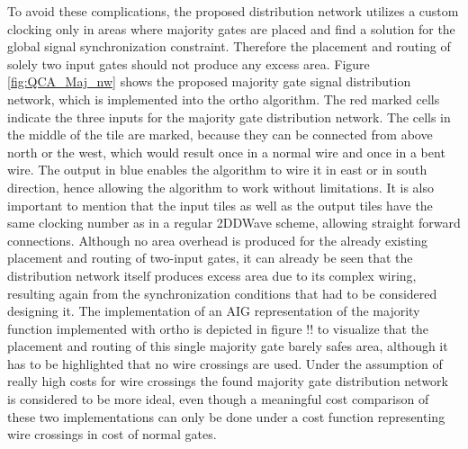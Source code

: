 To avoid these complications, the proposed distribution network utilizes a custom clocking only in areas where majority gates are placed and find a solution for the global signal synchronization constraint. Therefore the placement and routing of solely two input gates should not produce any excess area. Figure \ref{fig:QCA_Maj_nw} shows the proposed majority gate signal distribution network, which is implemented into the ortho algorithm. The red marked cells indicate the three inputs for the majority gate distribution network. The cells in the middle of the tile are marked, because they can be connected from above north or the west, which would result once in a normal wire and once in a bent wire. The output in blue enables the algorithm to wire it in east or in south direction, hence allowing the algorithm to work without limitations. It is also important to mention that the input tiles as well as the output tiles have the same clocking number as in a regular 2DDWave scheme, allowing straight forward connections. Although no area overhead is produced for the already existing placement and routing of two-input gates, it can already be seen that the distribution network itself produces excess area due to its complex wiring, resulting again from the synchronization conditions that had to be considered designing it. The implementation of an AIG representation of the majority function implemented with ortho is depicted in figure !! to visualize that the placement and routing of this single majority gate barely safes area, although it has to be highlighted that no wire crossings are used. Under the assumption of really high costs for wire crossings the found majority gate distribution network is considered to be more ideal, even though a meaningful cost comparison of these two implementations can only be done under a cost function representing wire crossings in cost of normal gates.\\
